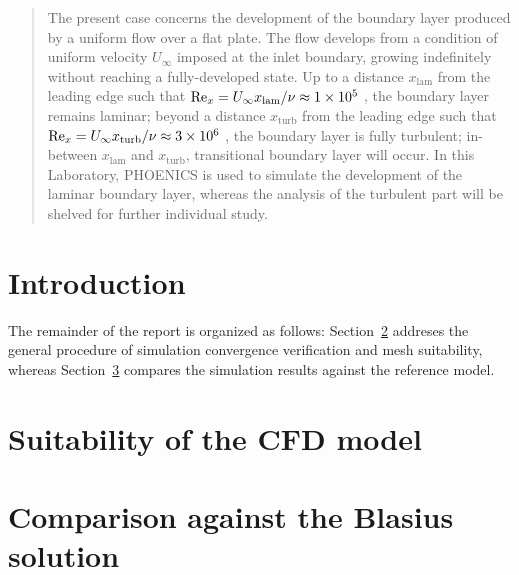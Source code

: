 \documentclass[12pt]{article}
\begin{document}
\maketitle

\begin{abstract}
        The present case concerns the development of the boundary layer produced by a uniform flow over a flat plate. The flow develops from a condition of uniform velocity \( U_\infty \) imposed at the inlet boundary, growing indefinitely without reaching a fully-developed state. Up to a distance \(x_{\text{lam}}\) from the leading edge such that \( \text{Re}_x = U_\infty x_{\text{lam}} / \nu \approx \num{1E5} \) , the boundary layer remains laminar; beyond a distance \( x_{\text{turb}} \) from the leading edge such that \( \text{Re}_x = U_\infty x_{\text{turb}} / \nu \approx \num{3E6} \) , the boundary layer is fully turbulent; in-between \( x_{\text{lam}} \) and \( x_{\text{turb}} \), transitional boundary layer will occur. In this Laboratory, PHOENICS is used to simulate the development of the laminar boundary layer, whereas the analysis of the turbulent part will be shelved for further individual study. \cite{FL:04}

\end{abstract}

\section{Introduction}
        

        The remainder of the report is organized as follows: Section~\ref{sec:suitability} addreses the general procedure of simulation convergence verification and mesh suitability, whereas Section~\ref{sec:comparison} compares the simulation results against the reference model.

\section{Suitability of the CFD model} \label{sec:suitability}

\section{Comparison against the Blasius solution} \label{sec:comparison}



\end{document}
